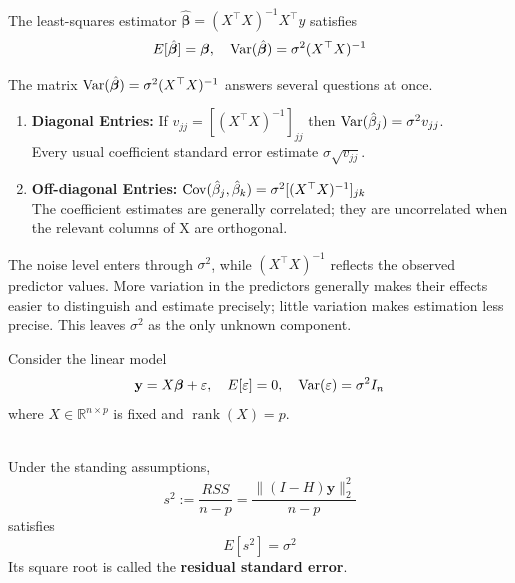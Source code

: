 \begin{theorem} \leavevmode\\
    The least-squares estimator $\hat{\bm\beta} =(X^\top X)^{-1}X^\top y$ satisfies
    \begin{equation*}
        E[\hat{\bm\beta}]= \bm\beta, \quad \operatorname{Var}(\hat{\bm\beta})=\sigma^2(X^\top X)^{-1}
    \end{equation*}
\end{theorem}

The matrix $\operatorname{Var}(\hat{\bm\beta})=\sigma^2(X^\top X)^{-1}$ answers several questions at once.
\begin{enumerate}
    \item \textbf{Diagonal Entries:} If $v_{jj}=[(X^\top X)^{-1}]_{jj}$ then $\operatorname{Var}(\hat\beta_j)=\sigma^2v_{jj}$. \\ Every usual coefficient standard error estimate $\sigma\sqrt{v_{jj}}$.
    \item \textbf{Off-diagonal Entries:} $\operatorname{Cov}(\hat\beta_j,\hat\beta_k) = \sigma^2[(X^\top X)^{-1}]_{jk}$
    \\The coefficient estimates are generally correlated; they are uncorrelated when the relevant columns of X are orthogonal.
\end{enumerate}

The noise level enters through $\sigma^2$, while $(X^\top X)^{-1}$ reflects the observed predictor values. More variation in the predictors generally makes their effects easier to distinguish and estimate precisely; little variation makes estimation less precise. This leaves $\sigma^2$ as the only unknown component. \newline

Consider the linear model
\begin{equation*}
    \mathbf{y} = X\bm\beta + \varepsilon, \quad E[\varepsilon]=0, \quad \operatorname{Var}(\varepsilon)=\sigma^2I_n
\end{equation*}
where $X \in \mathbb{R}^{n \times p}$ is fixed and $\operatorname{rank}(X)=p$.

\begin{theorem} \leavevmode\\
    Under the standing assumptions,
    \begin{equation*}
        s^2:= \frac{RSS}{n-p}=\frac{\lVert(I-H)\mathbf{y}\rVert_2^2}{n-p}
    \end{equation*}
    satisfies
    \begin{equation*}
        E[s^2]=\sigma^2
    \end{equation*}
    Its square root is called the \textbf{residual standard error}.
\end{theorem}

